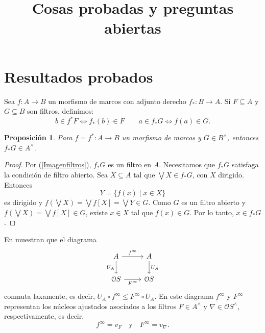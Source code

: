 \documentclass[11pt]{amsart}
\theoremstyle{plain}
\newtheorem{prop}[thm]{Proposición}
\theoremstyle{definition}
\begin{document}

\title{Cosas probadas y preguntas abiertas}


\author{}
\email{}
\address{}


\address{}



\maketitle
\section{Resultados probados}
Sea $f\colon A\to B$ un morfismo de marcos con adjunto derecho $f_*\colon B\to A$. Si $F\subseteq A$ y $G\subseteq B$ son filtros, definimos:
\begin{equation}\label{Imagenfiltros}
b\in f^*F \Longleftrightarrow f_*(b)\in F\qquad a\in f_*G \Longleftrightarrow f(a)\in G.
\end{equation}
\begin{prop}\label{fF}
Para $f=f^*\colon A\to B$ un morfismo de marcos y $G\in B^\wedge$, entonces $f_*G\in A^\wedge$.
\end{prop}

\begin{proof}
Por (\ref{Imagenfiltros}), $f_*G$ es un filtro en $A$. Necesitamos que $f_*G$ satisfaga la condición de filtro abierto. Sea $X\subseteq A$ tal que $\bigvee X\in f_*G$, con $X$ dirigido. Entonces
\[
Y=\{f(x)\mid x\in X\}
\] 
es dirigido y $f(\bigvee X)=\bigvee f[X]=\bigvee Y\in G$. Como $G$ es un filtro abierto y $f(\bigvee X)=\bigvee f[X]\in G$, existe $x\in X$ tal que $f(x)\in G$. Por lo tanto, $x\in f_*G$.
\end{proof}

En \cite[Lema 8.9 y Corolario 8.10]{simmons2004vietoris} muestran que el diagrama
\begin{equation}\label{Qlaxo}
\begin{tikzcd}
	A & A \\
	{\mathcal{O}S} & {\mathcal{O}S}
	\arrow["{f^\infty}", from=1-1, to=1-2]
	\arrow["{U_A}"', from=1-1, to=2-1]
	\arrow["{U_A}", from=1-2, to=2-2]
	\arrow["{F^\infty}"', from=2-1, to=2-2]
\end{tikzcd}
\end{equation}
conmuta laxamente, es decir, $U_A\circ f^\infty\leq F^\infty \circ U_A$. En este diagrama $f^\infty$ y $F^\infty$ representan los
núcleos ajustados asociados a los filtros $F\in A^\wedge$ y $\nabla\in \mathcal{O}S^\wedge$, respectivamente, es decir, 
\[
f^\infty=v_F\quad\text{y}\quad F^\infty =v_\nabla.
\]
\end{document}
